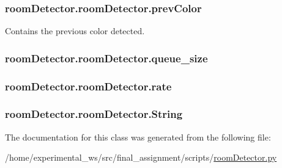 \subsubsection[{\texorpdfstring{prev\+Color}{prevColor}}]{\setlength{\rightskip}{0pt plus 5cm}room\+Detector.\+room\+Detector.\+prev\+Color\hspace{0.3cm}{\ttfamily [static]}}\hypertarget{classroomDetector_1_1roomDetector_a1e899d16548ade375ed0b0dc6e1d9d98}{}\label{classroomDetector_1_1roomDetector_a1e899d16548ade375ed0b0dc6e1d9d98}


Contains the previous color detected. 

\subsubsection[{\texorpdfstring{queue\+\_\+size}{queue_size}}]{\setlength{\rightskip}{0pt plus 5cm}room\+Detector.\+room\+Detector.\+queue\+\_\+size\hspace{0.3cm}{\ttfamily [static]}}\hypertarget{classroomDetector_1_1roomDetector_a86aaaea08936260cb6e591c10b0dfeae}{}\label{classroomDetector_1_1roomDetector_a86aaaea08936260cb6e591c10b0dfeae}
\subsubsection[{\texorpdfstring{rate}{rate}}]{\setlength{\rightskip}{0pt plus 5cm}room\+Detector.\+room\+Detector.\+rate\hspace{0.3cm}{\ttfamily [static]}}\hypertarget{classroomDetector_1_1roomDetector_ad3dbc1e4c7a827af098c86101198a1f4}{}\label{classroomDetector_1_1roomDetector_ad3dbc1e4c7a827af098c86101198a1f4}
\subsubsection[{\texorpdfstring{String}{String}}]{\setlength{\rightskip}{0pt plus 5cm}room\+Detector.\+room\+Detector.\+String\hspace{0.3cm}{\ttfamily [static]}}\hypertarget{classroomDetector_1_1roomDetector_a14b6749ddaf264a41497904c0513ed9b}{}\label{classroomDetector_1_1roomDetector_a14b6749ddaf264a41497904c0513ed9b}


The documentation for this class was generated from the following file\+:\begin{DoxyCompactItemize}
\item 
/home/experimental\+\_\+ws/src/final\+\_\+assignment/scripts/\hyperlink{roomDetector_8py}{room\+Detector.\+py}\end{DoxyCompactItemize}
